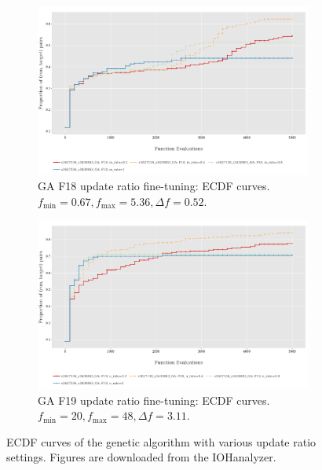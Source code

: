\documentclass{article}
\begin{document}
\begin{figure}[!ht]
    \centering
    \begin{subfigure}[h]{0.95\linewidth}
        \includegraphics[width=\linewidth]{ga/f18/urate_ecdf.png}
        \caption{GA F18 update ratio fine-tuning: ECDF curves. $f_{\min} = 0.67, f_{\max} = 5.36, \Delta f = 0.52$.}
    \end{subfigure}
    \hfill
    \begin{subfigure}[h]{0.95\linewidth}
        \includegraphics[width=\linewidth]{ga/f19/urate_ecdf.png}
        \caption{GA F19 update ratio fine-tuning: ECDF curves. $f_{\min} = 20, f_{\max} = 48, \Delta f = 3.11$.}
    \end{subfigure}
    \caption{ECDF curves of the genetic algorithm with various update ratio settings. Figures are downloaded from the IOHanalyzer.}
    \label{fig:experi-ga-urate-ecdf}
\end{figure}
\end{document}
